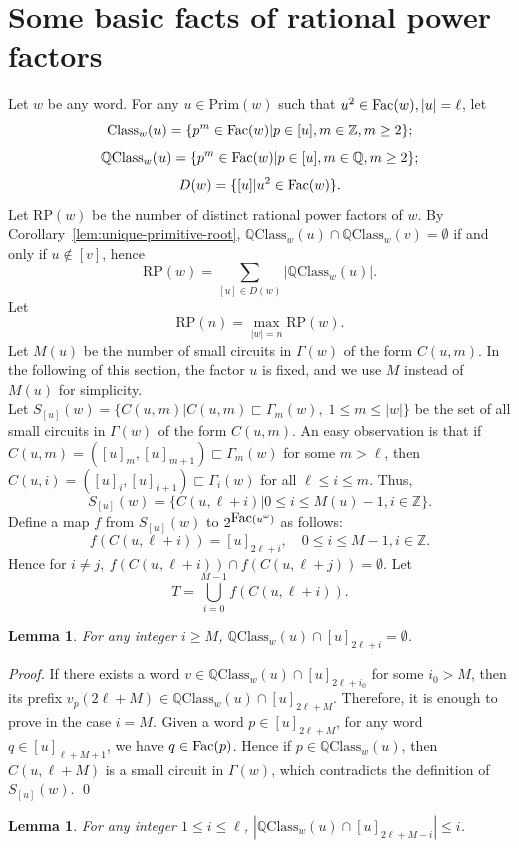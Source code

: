 \documentclass[runningheads,envcountsame,a4paper]{llncs}
\newtheorem{lem}[thm]{Lemma}
\newcommand{\fac}{\hbox{\rm Fac}}
\newcommand{\cl}{\mathrm{Class}}
\newcommand{\pri}{\mathrm{Prim}}
\newcommand{\qcl}{\mathbb{Q}\mathrm{Class}}
\newcommand{\QQ}{\mathbb{Q}}
\newcommand{\ZZ}{\mathbb{Z}}
\newcommand{\rp}{\mathrm{RP}}
\begin{document}
\section{Some basic facts of rational power factors}\label{sec3}

Let $w$ be any word. For any $u\in\pri(w)$ such that $u^2\in\fac(w),|u|=\ell$, let 
$$\cl_w(u)=\{ p^m\in\fac(w)| p\in[u],m\in\ZZ,m\ge 2\};$$
$$\qcl_w(u)=\{ p^m\in\fac(w)| p\in[u],m\in\QQ,m\ge 2\};$$
$$D(w)=\{[u]|u^2\in\fac(w)\}.$$ 
Let $\rp(w)$ be the number of distinct rational power factors of $w$. By Corollary~\ref{lem:unique-primitive-root}, $\qcl_w(u)\cap\qcl_w(v)=\emptyset$ if and only if $u \not \in [v]$, hence
$$\rp(w)=\sum\limits_{[u]\in D(w)}|\qcl_w(u)|.$$
Let $$\rp(n)=\max_{|w|=n} \rp(w).$$
Let $M(u)$ be the number of small circuits in $\Gamma(w)$ of the form $C(u,m)$. In the following of this section, the factor $u$ is fixed, and we use $M$ instead of $M(u)$ for simplicity.\\ 
Let $S_{[u]}(w)=\{C(u,m)| C(u,m) \sqsubset \Gamma_m(w),\; 1\leq m\le|w|\}$ be the set of all small circuits in $\Gamma(w)$ of the form $C(u,m)$.
An easy observation is that if 
\(C(u,m)=([u]_m, [u]_{m+1}) \sqsubset \Gamma_m(w)\) for some $m > \ell$, then \(C(u,i)=([u]_{i}, [u]_{i+1}) \sqsubset \Gamma_{i}(w)\) for all $\ell \leq i\leq m$. Thus,
$$S_{[u]}(w)=\{C(u,\ell+i)|0\le i\le M(u)-1, i\in\ZZ\}.$$
Define a map $f$ from $S_{[u]}(w)$ to $2^{\fac(u^{\omega})}$ as follows:
$$f(C(u,\ell+i))=[u]_{2\ell+i},\quad 0\le i\le M-1, i\in\ZZ.$$
Hence for $i\ne j,\ f(C(u,\ell+i)) \cap f(C(u,\ell+j))= \emptyset$.
Let 
$$T=\bigcup_{i=0}^{M-1} f(C(u,\ell+i)).$$

\begin{lem}\label{no long factors}
For any integer $i\ge M$, $\qcl_w(u) \cap [u]_{2\ell+i}=\emptyset $.
\end{lem}

\begin{proof}
If there exists a word $v\in\qcl_w(u) \cap [u]_{2\ell+i_0}$ for some $i_0>M$, then its prefix $v_p(2\ell+M)\in\qcl_w(u) \cap [u]_{2\ell+M}$. Therefore, it is enough to prove in the case $i=M$. Given a word $p\in [u]_{2\ell+M}$, for any word $q\in [u]_{\ell+M+1}$, we have $q\in\fac(p)$. Hence if $p\in\qcl_w(u)$, then $C(u,\ell+M)$ is a small circuit in $\Gamma(w)$, which contradicts the definition of $S_{[u]}(w)$. \qed
\end{proof}

\begin{lem}\label{number of long rational factors}
For any integer $1\le i\le \ell$, $|\qcl_w(u) \cap [u]_{2\ell+M-i}|\le i$.
\end{lem}
\end{document}

